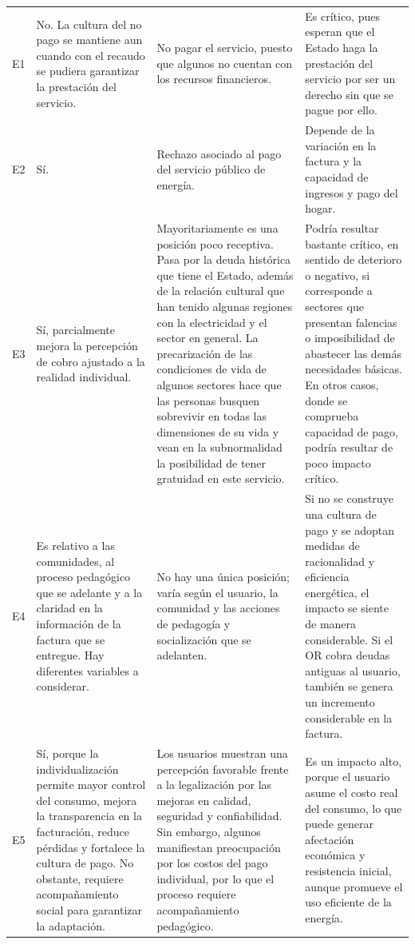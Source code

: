 \begin{longtable}{>{\centering}p{0.7cm}
                  >{\RaggedRight}p{4.5cm}
                  >{\RaggedRight}p{4.5cm}
                  >{\RaggedRight\arraybackslash}p{4.5cm}}
E1  & No. La cultura del no pago se mantiene aun cuando con el recaudo se pudiera garantizar la prestación del servicio. & No pagar el servicio, puesto que algunos no cuentan con los recursos financieros. & Es crítico, pues esperan que el Estado haga la prestación del servicio por ser un derecho sin que se pague por ello. \\
\rowcolor{grisclaro}
E2  & Sí. & Rechazo asociado al pago del servicio público de energía. & Depende de la variación en la factura y la capacidad de ingresos y pago del hogar. \\
E3  & Sí, parcialmente mejora la percepción de cobro ajustado a la realidad individual. & Mayoritariamente es una posición poco receptiva. Pasa por la deuda histórica que tiene el Estado, además de la relación cultural que han tenido algunas regiones con la electricidad y el sector en general. La precarización de las condiciones de vida de algunos sectores hace que las personas busquen sobrevivir en todas las dimensiones de su vida y vean en la subnormalidad la posibilidad de tener gratuidad en este servicio. & Podría resultar bastante crítico, en sentido de deterioro o negativo, si corresponde a sectores que presentan falencias o imposibilidad de abastecer las demás necesidades básicas. En otros casos, donde se comprueba capacidad de pago, podría resultar de poco impacto crítico. \\
\rowcolor{grisclaro}
E4  & Es relativo a las comunidades, al proceso pedagógico que se adelante y a la claridad en la información de la factura que se entregue. Hay diferentes variables a considerar. & No hay una única posición; varía según el usuario, la comunidad y las acciones de pedagogía y socialización que se adelanten. & Si no se construye una cultura de pago y se adoptan medidas de racionalidad y eficiencia energética, el impacto se siente de manera considerable. Si el OR cobra deudas antiguas al usuario, también se genera un incremento considerable en la factura. \\
E5  & Sí, porque la individualización permite mayor control del consumo, mejora la transparencia en la facturación, reduce pérdidas y fortalece la cultura de pago. No obstante, requiere acompañamiento social para garantizar la adaptación. & Los usuarios muestran una percepción favorable frente a la legalización por las mejoras en calidad, seguridad y confiabilidad. Sin embargo, algunos manifiestan preocupación por los costos del pago individual, por lo que el proceso requiere acompañamiento pedagógico. & Es un impacto alto, porque el usuario asume el costo real del consumo, lo que puede generar afectación económica y resistencia inicial, aunque promueve el uso eficiente de la energía. \\

\end{longtable}
